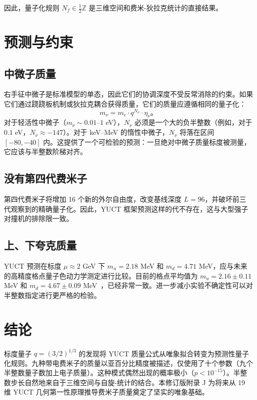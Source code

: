 \documentclass[12pt,a4paper]{article}
\begin{document}
	因此，量子化规则 \(N_f \in \frac{1}{2}\mathbb{Z}\) 是三维空间和费米-狄拉克统计的直接结果。
	
	\section{预测与约束}
	
	\subsection{中微子质量}
	
	右手征中微子是标准模型的单态，因此它们的协调深度不受反常消除的约束。如果它们通过跷跷板机制或狄拉克耦合获得质量，它们的质量应遵循相同的量子化：
	\begin{equation}
		m_\nu = m_e \cdot q^{N_\nu} \cdot \eta_\nu。
	\end{equation}
	对于轻活性中微子（\(m_\nu \sim 0.01\)–\(1\) eV），\(N_\nu\) 必须是一个大的负半整数（例如，对于 \(0.1\) eV，\(N_\nu \approx -147\)）。对于 keV–MeV 的惰性中微子，\(N_\nu\) 将落在区间 \([-80, -40]\) 内。这提供了一个可检验的预测：一旦绝对中微子质量标度被测量，它应该与半整数阶梯对齐。
	
	\subsection{没有第四代费米子}
	
	第四代费米子将增加 16 个新的外尔自由度，改变基线深度 \(L=96\)，并破坏前三代观察到的精确量子化。因此，YUCT 框架预测这样的代不存在，这与大型强子对撞机的排除限一致。
	
	\subsection{上、下夸克质量}
	
	YUCT 预测在标度 \(\mu \approx 2\) GeV 下 \(m_u = 2.18\) MeV 和 \(m_d = 4.71\) MeV，应与未来的高精度格点量子色动力学测定进行比较。目前的格点平均值为 \(m_u = 2.16 \pm 0.11\) MeV 和 \(m_d = 4.67 \pm 0.09\) MeV~\cite{PDG2024}，已经非常一致。进一步减小实验不确定性可以对半整数指定进行更严格的检验。
	
	\section{结论}
	
	标度量子 \(q = (3/2)^{1/3}\) 的发现将 YUCT 质量公式从唯象拟合转变为预测性量子化规则。九种带电费米子的质量以亚百分比精度被描述，仅使用了十个参数（九个半整数量子数加上电子质量）。这种模式偶然出现的概率极小（\(p < 10^{-15}\)）。半整数步长自然地来自于三维空间与自旋-统计的结合。本修订版附录 J 为将来从 19 维 YUCT 几何第一性原理推导费米子质量奠定了坚实的唯象基础。
	
\end{document}
